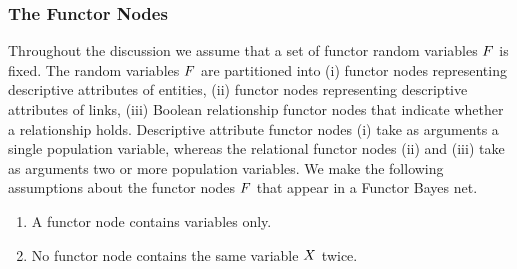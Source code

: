 %
%
%
%
%







\subsubsection{The Functor Nodes} \label{sec:fnodes}
Throughout the discussion we assume that a set of functor random variables $F$ is fixed. The random variables $F$ are partitioned into (i) functor nodes representing descriptive attributes of entities, (ii) functor nodes representing descriptive attributes of links, (iii) Boolean relationship functor nodes that indicate whether a relationship holds. Descriptive attribute functor nodes (i) take as arguments a single population variable, whereas the relational functor nodes (ii) and (iii) take as arguments two or more population variables. %
We make the following assumptions about the functor nodes $F$ that appear in a Functor Bayes net.

\begin{enumerate}
\item A functor node contains variables only.
\item No functor node contains the same variable $X$ twice.
\end{enumerate}

